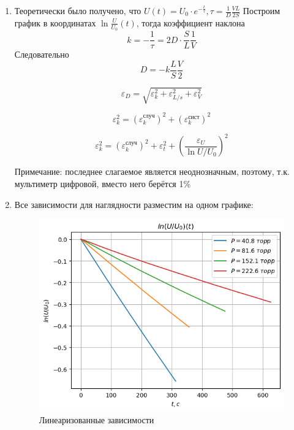 \documentclass[a4paper,12pt]{article}
\begin{document}
\begin{enumerate}
\item Теоретически было получено, что $U(t) = U_0\cdot e^{-\frac{t}{\tau}}, \tau = \frac{1}{D} \frac{VL}{2S} $ \newline
Построим график в координатах $\ln{\frac{U}{U_0}}(t)$, тогда коэффициент наклона
\begin{equation}
    k = -\frac{1}{\tau} = 2D \cdot \frac{S}{L} \frac{1}{V}
\end{equation}
Следовательно
\begin{equation}
    D = -k\frac{L}{S}\frac{V}{2}
\end{equation}

\begin{equation}
    \varepsilon_D = \sqrt{\varepsilon_k^2 + \varepsilon_{L/s}^2 + \varepsilon_V^2}
\end{equation}

\begin{equation}
    \varepsilon_k^2 = (\varepsilon_k^{\text{случ}})^2 + (\varepsilon_k^{\text{сист}})^2
\end{equation}

\begin{equation}
    \varepsilon_k^2 = (\varepsilon_k^{\text{случ}})^2 + \varepsilon_t^2 + (\frac{\varepsilon_U}{\ln{U/U_0}})^2
\end{equation}

Примечание: последнее слагаемое является неоднозначным, поэтому, т.к. мультиметр цифровой, вместо него берётся 1\%

\item Все зависимости для наглядности разместим на одном графике:

\begin{figure}[!h]
    \centering
    \includegraphics[scale = 1]{lnU.png}
    \caption{Линеаризованные зависимости}
\end{figure}


\end{enumerate}
\end{document}
